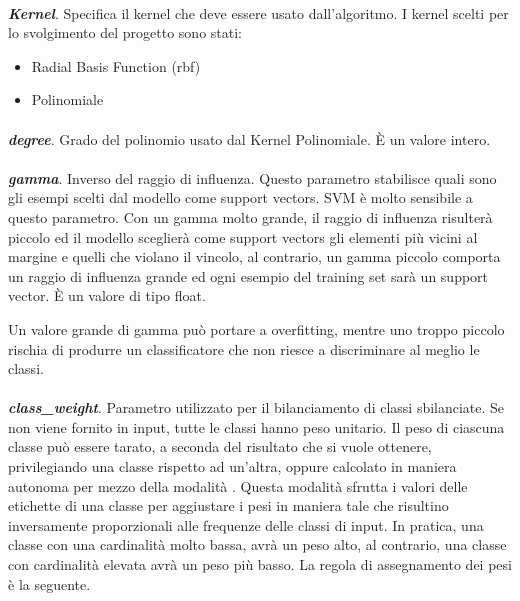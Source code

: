 \documentclass[12pt,a4paper,oneside,hidelinks]{report}
\begin{document}
\paragraph*{}
\textbf{\textit{Kernel}}. Specifica il kernel che deve essere usato dall'algoritmo. I kernel scelti per lo svolgimento del progetto sono stati:

\begin{itemize}
    \item Radial Basis Function (rbf) 
    \item Polinomiale
\end{itemize}

\paragraph*{}
\textbf{\textit{degree}}. Grado del polinomio usato dal Kernel Polinomiale. È un valore intero.

\paragraph*{}
\textbf{\textit{gamma}}. Inverso del raggio di influenza. Questo parametro stabilisce quali sono gli esempi scelti dal modello come support vectors. SVM è molto sensibile a questo parametro. Con un gamma molto grande, il raggio di influenza risulterà piccolo ed il modello sceglierà come support vectors gli elementi più vicini al margine e quelli che violano il vincolo, al contrario, un gamma piccolo comporta un raggio di influenza grande ed ogni esempio del training set sarà un support vector. È un valore di tipo float.

Un valore grande di gamma può portare a overfitting, mentre uno troppo piccolo rischia di produrre un classificatore che non riesce a discriminare al meglio le classi.

\paragraph*{}
\textbf{\textit{class\_weight}}. Parametro utilizzato per il bilanciamento di classi sbilanciate. Se non viene fornito in input, tutte le classi hanno peso unitario. Il peso di ciascuna classe può essere tarato, a seconda del risultato che si vuole ottenere, privilegiando una classe rispetto ad un'altra, oppure calcolato in maniera autonoma per mezzo della modalità . 
Questa modalità sfrutta i valori delle etichette di una classe per aggiustare i pesi in maniera tale che risultino inversamente proporzionali alle frequenze delle classi di input. In pratica, una classe con una cardinalità molto bassa, avrà un peso alto, al contrario, una classe con cardinalità elevata avrà un peso più basso. La regola di assegnamento dei pesi è la seguente.
\end{document}
